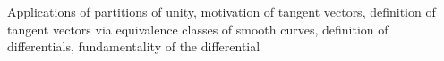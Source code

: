 Applications of partitions of unity, motivation of tangent vectors, definition of
tangent vectors via equivalence classes of smooth curves, definition of differentials, fundamentality of the differential